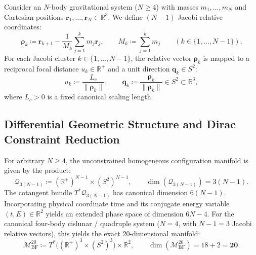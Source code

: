 \documentclass[11pt,a4paper,reqno]{article}
\theoremstyle{plain}
\theoremstyle{definition}
\theoremstyle{remark}
\numberwithin{equation}{section}
\newcommand{\MbfTwenty}{\mathcal{M}_{\mathrm{BF}}^{20}}
\begin{document}
Consider an $N$-body gravitational system ($N \ge 4$) with masses $m_1, \dots, m_N$ and Cartesian positions $\bm{r}_1, \dots, \bm{r}_N \in \mathbb{R}^3$. We define $(N-1)$ Jacobi relative coordinates:
\begin{equation}
  \bm{\rho}_k \coloneqq \bm{r}_{k+1} - \frac{1}{M_k} \sum_{j=1}^k m_j \bm{r}_j, \qquad M_k \coloneqq \sum_{j=1}^k m_j \qquad (k \in \{1, \dots, N-1\}).
  \label{eq:jacobi_coordinates_general}
\end{equation}
For each Jacobi cluster $k \in \{1, \dots, N-1\}$, the relative vector $\bm{\rho}_k$ is mapped to a reciprocal focal distance $u_k \in \mathbb{R}^+$ and a unit direction $\bm{q}_k \in S^2$:
\begin{equation}
  u_k \coloneqq \frac{L_c}{\|\bm{\rho}_k\|}, \qquad \bm{q}_k \coloneqq \frac{\bm{\rho}_k}{\|\bm{\rho}_k\|} \in S^2 \subset \mathbb{R}^3,
  \label{eq:focal_mapping_nbody}
\end{equation}
where $L_c > 0$ is a fixed canonical scaling length. 

\subsection{Differential Geometric Structure and Dirac Constraint Reduction}
\label{subsec:mbf20_geometry}

For arbitrary $N \ge 4$, the unconstrained homogeneous configuration manifold is given by the product:
\begin{equation}
  \mathcal{Q}_{3(N-1)} \coloneqq (\mathbb{R}^+)^{N-1} \times (S^2)^{N-1}, \qquad \dim(\mathcal{Q}_{3(N-1)}) = 3(N-1).
\end{equation}
The cotangent bundle $T^*\mathcal{Q}_{3(N-1)}$ has canonical dimension $6(N-1)$. Incorporating physical coordinate time and its conjugate energy variable $(t, E) \in \mathbb{R}^2$ yields an extended phase space of dimension $6N - 4$.
For the canonical four-body cislunar / quadruple system ($N = 4$, with $N-1 = 3$ Jacobi relative vectors), this yields the exact 20-dimensional manifold:
\begin{equation}
  \MbfTwenty \coloneqq T^*\Big( (\mathbb{R}^+)^3 \times (S^2)^3 \Big) \times \mathbb{R}^2, \qquad \dim(\MbfTwenty) = 18 + 2 = \mathbf{20}.
  \label{eq:mbf20_exact_bundle_def}
\end{equation}
\end{document}

